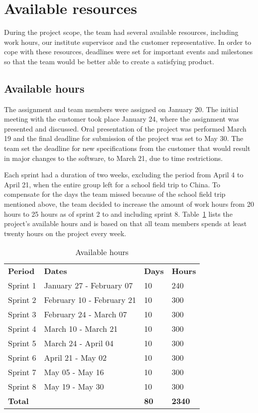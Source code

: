 \newpage
\section{Available resources}
During the project scope, the team had several available resources, including work hours, our institute supervisor and the customer representative. In order to cope with these resources, deadlines were set for important events and milestones so that the team would be better able to create a satisfying product.


\subsection{Available hours}

The assignment and team members were assigned on January 20. The initial meeting with the customer took place January 24, where the assignment was presented and discussed. Oral presentation of the project was performed March 19 and the final deadline for submission of the project was set to May 30. The team set the deadline for new specifications from the customer that would result in major changes to the software, to March 21, due to time restrictions.

Each sprint had a duration of two weeks, excluding the period from April 4 to April 21, when the entire group left for a school field trip to China. To compensate for the days the team missed because of the school field trip mentioned above, the team decided to increase the amount of work hours from 20 hours to 25 hours as of sprint 2 to and including sprint 8. Table~\ref{tab:availHours} lists the project's available hours and is based on that all team members spends at least twenty hours on the project every week.


\begin{table}[H]
\centering
{}
\begin{tabular}{|l|l|l|l|}
\hline
\textbf{Period} & \textbf{Dates} & \textbf{Days} & \textbf{Hours}\\
Sprint 1& January 27 - February 07 & 10  & 240 \\
Sprint 2 & February 10 - February 21 &10  & 300 \\
Sprint 3 & February 24 - March 07 &10 & 300 \\
Sprint 4 & March 10 - March 21 &10  &300 \\
Sprint 5 & March 24 - April 04 &10&  300 \\
Sprint 6 & April 21 - May 02 &10  &300 \\
Sprint 7 & May 05 - May 16 &10  &300 \\
Sprint 8 & May 19 - May 30 &10  &300 \\
\textbf{Total}&& \textbf{80}&  \textbf{2340}\\\hline
\end{tabular}
\caption{Available hours}
\label{tab:availHours}
\end{table}


